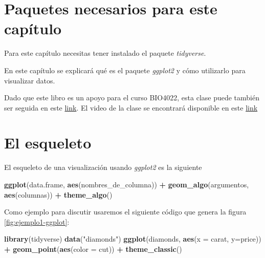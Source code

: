 \documentclass[]{book}
\newenvironment{Shaded}{\begin{snugshade}}{\end{snugshade}}
\newcommand{\DataTypeTok}[1]{\textcolor[rgb]{0.13,0.29,0.53}{#1}}
\newcommand{\KeywordTok}[1]{\textcolor[rgb]{0.13,0.29,0.53}{\textbf{#1}}}
\newcommand{\NormalTok}[1]{#1}
\newcommand{\OperatorTok}[1]{\textcolor[rgb]{0.81,0.36,0.00}{\textbf{#1}}}
\newcommand{\StringTok}[1]{\textcolor[rgb]{0.31,0.60,0.02}{#1}}
\begin{document}
\hypertarget{paquetes-necesarios-para-este-capitulo-3}{%
\section{Paquetes necesarios para este
capítulo}\label{paquetes-necesarios-para-este-capitulo-3}}

Para este capítulo necesitas tener instalado el paquete
\emph{tidyverse}.

En este capítulo se explicará qué es el paquete \emph{ggplot2}
\citep{Wickhamggplot} y cómo utilizarlo para visualizar datos.

Dado que este libro es un apoyo para el curso BIO4022, esta clase puede
también ser seguida en este
\href{https://derek-corcoran-barrios.github.io/Clase4/Clase4Visualizacion}{link}.
El video de la clase se encontrará disponible en este
\href{https://youtu.be/YKEiqSDz-c8}{link}

\hypertarget{el-esqueleto}{%
\section{El esqueleto}\label{el-esqueleto}}

El esqueleto de una visualización usando \emph{ggplot2} es la siguiente

\begin{Shaded}
\begin{Highlighting}[]
\KeywordTok{ggplot}\NormalTok{(data.frame, }\KeywordTok{aes}\NormalTok{(nombres_de_columna)) }\OperatorTok{+}\StringTok{ }\KeywordTok{geom_algo}\NormalTok{(argumentos, }
    \KeywordTok{aes}\NormalTok{(columnas)) }\OperatorTok{+}\StringTok{ }\KeywordTok{theme_algo}\NormalTok{()}
\end{Highlighting}
\end{Shaded}

Como ejemplo para discutir usaremos el siguiente código que genera la
figura \ref{fig:ejemplo1-ggplot}:

\begin{Shaded}
\begin{Highlighting}[]
\KeywordTok{library}\NormalTok{(tidyverse)}
\KeywordTok{data}\NormalTok{(}\StringTok{"diamonds"}\NormalTok{)}
\KeywordTok{ggplot}\NormalTok{(diamonds, }\KeywordTok{aes}\NormalTok{(}\DataTypeTok{x =}\NormalTok{ carat, }\DataTypeTok{y=}\NormalTok{price)) }\OperatorTok{+}\StringTok{ }\KeywordTok{geom_point}\NormalTok{(}\KeywordTok{aes}\NormalTok{(}\DataTypeTok{color =}\NormalTok{ cut)) }\OperatorTok{+}\StringTok{ }\KeywordTok{theme_classic}\NormalTok{()}
\end{Highlighting}
\end{Shaded}
\end{document}
